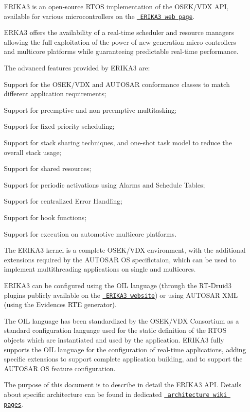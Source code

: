 E\+R\+I\+K\+A3 is an open-\/source R\+T\+OS implementation of the O\+S\+E\+K/\+V\+DX A\+PI, available for various microcontrollers on the \href{http://www.erika-enterprise.com}{\texttt{ E\+R\+I\+K\+A3 web page}}.

E\+R\+K\+A3 offers the availability of a real-\/time scheduler and resource managers allowing the full exploitation of the power of new generation micro-\/controllers and multicore platforms while guaranteeing predictable real-\/time performance.

The advanced features provided by E\+R\+I\+K\+A3 are\+:


\begin{DoxyItemize}
\item Support for the O\+S\+E\+K/\+V\+DX and A\+U\+T\+O\+S\+AR conformance classes to match different application requirements;
\item Support for preemptive and non-\/preemptive multitasking;
\item Support for fixed priority scheduling;
\item Support for stack sharing techniques, and one-\/shot task model to reduce the overall stack usage;
\item Support for shared resources;
\item Support for periodic activations using Alarms and Schedule Tables;
\item Support for centralized Error Handling;
\item Support for hook functions;
\item Support for execution on automotive multicore platforms.
\end{DoxyItemize}

The E\+R\+I\+K\+A3 kernel is a complete O\+S\+E\+K/\+V\+DX environment, with the additional extensions required by the A\+U\+T\+O\+S\+AR OS specifictaion, which can be used to implement multithreading applications on single and multicores.

E\+R\+I\+K\+A3 can be configured using the O\+IL language (through the R\+T-\/\+Druid3 plugins publicly available on the \href{http://www.erika-enterprise.com}{\texttt{ E\+R\+I\+K\+A3 website}}) or using A\+U\+T\+O\+S\+AR X\+ML (using the Evidence\textquotesingle{}s R\+TE generator).

The O\+IL language has been standardized by the O\+S\+E\+K/\+V\+DX Consortium as a standard configuration language used for the static definition of the R\+T\+OS objects which are instantiated and used by the application. E\+R\+I\+K\+A3 fully supports the O\+IL language for the configuration of real-\/time applications, adding specific extensions to support complete application building, and to support the A\+U\+T\+O\+S\+AR OS feature configuration.

The purpose of this document is to describe in detail the E\+R\+I\+K\+A3 A\+PI. Details about specific architecture can be found in dedicated \href{http://www.erika-enterprise.com/wiki/index.ph}{\texttt{ architecture wiki pages}}. 